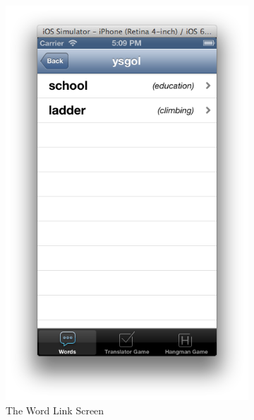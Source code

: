 \documentclass[11pt, a4paper]{article}
\begin{document}
\begin{figure}[h]
\begin{subfigure}[b]{0.3\textwidth}
\includegraphics[width=\textwidth]{img/word-link}
\caption{The Word Link Screen}
\end{subfigure}
\begin{subfigure}[b]{0.3\textwidth}

\end{subfigure}
\end{figure}
\end{document}
